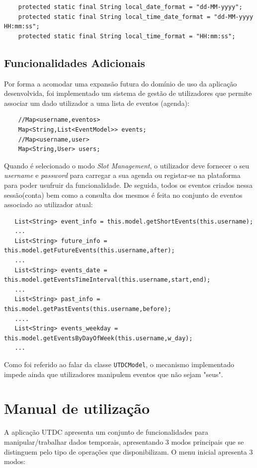 \documentclass{article}
\begin{document}
\begin{verbatim}
    protected static final String local_date_format = "dd-MM-yyyy";
    protected static final String local_time_date_format = "dd-MM-yyyy HH:mm:ss";
    protected static final String local_time_format = "HH:mm:ss"; 
\end{verbatim}

\subsection{Funcionalidades Adicionais}
Por forma a acomodar uma expansão futura do domínio de uso da aplicação desenvolvida, foi implementado um sistema de gestão de utilizadores
que permite associar um dado utilizador a uma lista de eventos (agenda):
\begin{verbatim}
    //Map<username,eventos>
    Map<String,List<EventModel>> events;
    //Map<username,user>
    Map<String,User> users;
\end{verbatim}

Quando é selecionado o modo \textit{Slot Management}, o utilizador deve fornecer o seu \textit{username} e \textit{password} para carregar a sua agenda ou registar-se na plataforma para poder usufruir da funcionalidade.
De seguida, todos os eventos criados nessa sessão(conta) bem como a consulta dos mesmos é feita no conjunto de eventos associado ao utilizador atual:
\begin{verbatim}
   List<String> event_info = this.model.getShortEvents(this.username);     
   ...
   List<String> future_info = this.model.getFutureEvents(this.username,after);
   ...
   List<String> events_date = this.model.getEventsTimeInterval(this.username,start,end);
   ...
   List<String> past_info = this.model.getPastEvents(this.username,before);
   ....
   List<String> events_weekday = this.model.getEventsByDayOfWeek(this.username,w_day);
   ...
\end{verbatim}

Como foi referido ao falar da classe \texttt{UTDCModel}, o mecanismo implementado impede ainda que utilizadores manipulem eventos que não sejam "seus".

\newpage

\section{Manual de utilização}
A aplicação UTDC apresenta um conjunto de funcionalidades para manipular/trabalhar dados temporais, apresentando 3 modos principais que se distinguem pelo tipo de operações que disponibilizam.
O menu inicial apresenta 3 modos:
\end{document}

